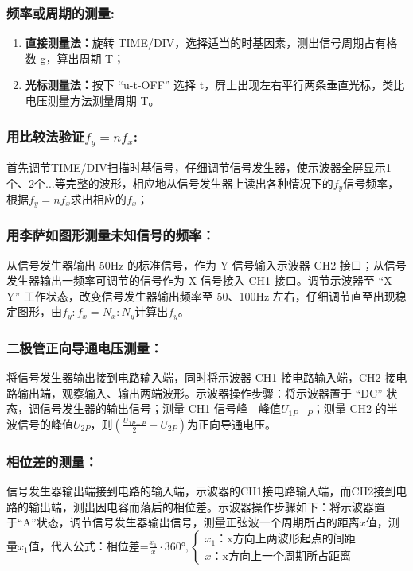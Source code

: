 \documentclass[10pt,a4paper]{ctexart}
\begin{document}
    \subsubsection*{频率或周期的测量:}

    \begin{enumerate}
        \item \textbf{直接测量法：}旋转 TIME/DIV，选择适当的时基因素，测出信号周期占有格数 g，算出周期 T；        
        \item \textbf{光标测量法：}按下 “u-t-OFF” 选择 t，屏上出现左右平行两条垂直光标，类比电压测量方法测量周期 T。
    \end{enumerate}

    \subsubsection*{用比较法验证\(f_y = nf_x\):}

    首先调节TIME/DIV扫描时基信号，仔细调节信号发生器，使示波器全屏显示1个、2个$\dots$等完整的波形，相应地从信号发生器上读出各种情况下的$f_y$信号频率，根据$f_y=nf_x$求出相应的$f_x$；

    \subsubsection*{用李萨如图形测量未知信号的频率：}

    从信号发生器输出 50Hz 的标准信号，作为 Y 信号输入示波器 CH2 接口；从信号发生器输出一频率可调节的信号作为 X 信号接入 CH1 接口。调节示波器至 “X-Y” 工作状态，改变信号发生器输出频率至 50、100Hz 左右，仔细调节直至出现稳定图形，由\(f_y:f_x = N_x:N_y\)计算出\(f_y\)。

    \subsubsection*{二极管正向导通电压测量：}

    将信号发生器输出接到电路输入端，同时将示波器 CH1 接电路输入端，CH2 接电路输出端，观察输入、输出两端波形。示波器操作步骤：将示波器置于 “DC” 状态，调信号发生器的输出信号；测量 CH1 信号峰 - 峰值\(U_{1P-P}\)；测量 CH2 的半波信号的峰值\(U_{2P}\)，则\((\frac{U_{1P-P}}{2} - U_{2P})\)为正向导通电压。
    
    \subsubsection*{相位差的测量：}

    信号发生器输出端接到电路的输入端，示波器的CH1接电路输入端，而CH2接到电路的输出端，测出因电容而落后的相位差。示波器操作步骤如下：将示波器置于“A”状态，调节信号发生器输出信号，测量正弦波一个周期所占的距离$x$值，测量$x_1$值，代入公式：相位差=$\frac{x_1}{x} \cdot 360°, 
    \left\{\begin{array}{l}
        x_1\text{：x方向上两波形起点的间距}\\
        x\text{：x方向上一个周期所占距离}
    \end{array}\right.$
\end{document}
